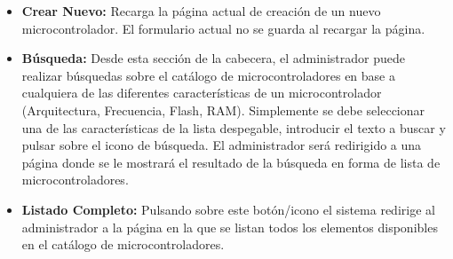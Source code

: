 \begin{itemize}
	
	\item \textbf{Crear Nuevo:} Recarga la página actual de creación de un nuevo microcontrolador. El formulario actual no se guarda al recargar la página.

	\item \textbf{Búsqueda:} Desde esta sección de la cabecera, el administrador puede realizar búsquedas sobre el catálogo de microcontroladores en base a cualquiera de las diferentes características de un microcontrolador (Arquitectura, Frecuencia, Flash, RAM). Simplemente se debe seleccionar una de las características de la lista despegable, introducir el texto a buscar y pulsar sobre el icono de búsqueda.
	El administrador será redirigido a una página donde se le mostrará el resultado de la búsqueda en forma de lista de microcontroladores.
			
	\item \textbf{Listado Completo:} Pulsando sobre este botón/icono el sistema redirige al administrador a la página en la que se listan todos los elementos disponibles en el catálogo de microcontroladores.
\end{itemize}